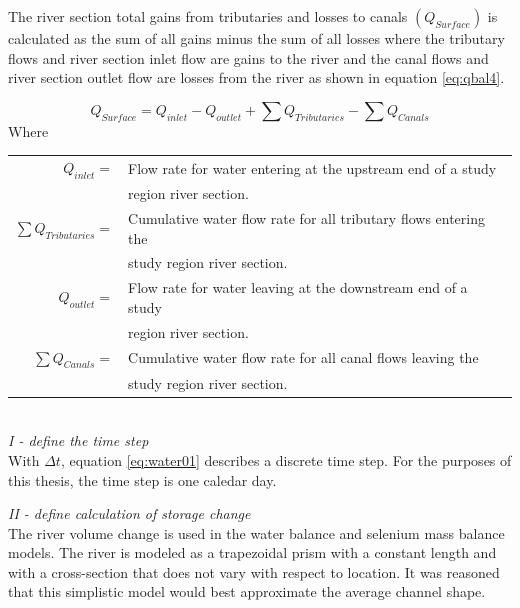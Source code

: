 \begin{linenumbers}
The river section total gains from tributaries and losses to canals $(Q_{Surface})$ is calculated as the sum of all gains minus the sum of all losses where the tributary flows and river section inlet flow are gains to the river and the canal flows and river section outlet flow are losses from the river as shown in equation \ref{eq:qbal4}.  

\begin{equation}
	Q_{Surface} = Q_{inlet} - Q_{outlet} + \sum Q_{Tributaries} - \sum Q_{Canals}
	\label{eq:qbal4}
\end{equation}
Where\\
\begin{tabular}{rl}
$Q_{inlet} =$& Flow rate for water entering at the upstream end of a study \\
&region river section.\\
$\sum Q_{Tributaries} =$& Cumulative water flow rate for all tributary flows entering the \\
&study region river section.\\
$Q_{outlet} =$& Flow rate for water leaving at the downstream end of a study \\
&region river section.\\
$\sum Q_{Canals} =$& Cumulative water flow rate for all canal flows leaving the \\
&study region river section.\\
\end{tabular}\\

\emph{I - define the time step}\\

With $ \Delta t $, equation \ref{eq:water01} describes a discrete time step.  For the purposes of this thesis, the time step is one caledar day.

\emph{II - define calculation of storage change}\\
The river volume change is used in the water balance and selenium mass balance models.  The river is modeled as a trapezoidal prism with a constant length and with a cross-section that does not vary with respect to location.  It was reasoned that this simplistic model would best approximate the average channel shape.  


\end{linenumbers}
